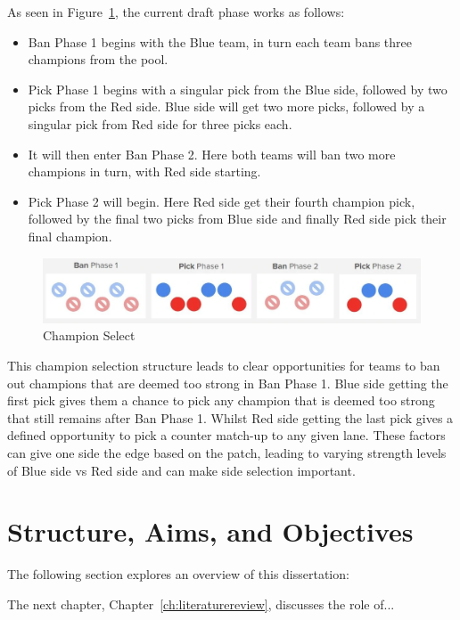 As seen in Figure~\ref{fig:draft}, the current draft phase works as follows:
\begin{itemize}
    \item Ban Phase 1 begins with the Blue team, in turn each team bans three champions from the pool.
    \item Pick Phase 1 begins with a singular pick from the Blue side, followed by two picks from the Red side.
     Blue side will get two more picks, followed by a singular pick from Red side for three picks each.
    \item It will then enter Ban Phase 2.
    Here both teams will ban two more champions in turn, with Red side starting.
    \item Pick Phase 2 will begin.
    Here Red side get their fourth champion pick, followed by the final two picks from Blue side and finally Red side pick their final champion.
\end{itemize}

\begin{figure}[h!]
    \centering
    \includegraphics[width=1\textwidth]{figures/DraftPhase}
    \caption{Champion Select}
    \label{fig:draft}
\end{figure}

This champion selection structure leads to clear opportunities for teams to ban out champions that are deemed too strong in Ban Phase 1.
Blue side getting the first pick gives them a chance to pick any champion that is deemed too strong that still remains after Ban Phase 1.
Whilst Red side getting the last pick gives a defined opportunity to pick a counter match-up to any given lane.
These factors can give one side the edge based on the \Gls{patch}, leading to varying strength levels of Blue side vs Red side and can make side selection important.

\section{Structure, Aims, and Objectives}\label{sec:Structure, Aims, and Objectives}

The following section explores an overview of this dissertation:

The next chapter, Chapter~\ref{ch:literaturereview}, discusses the role of...

